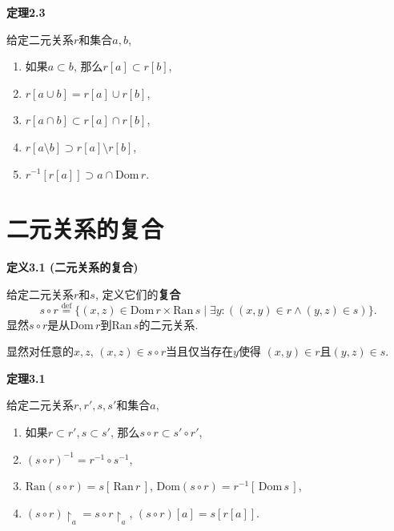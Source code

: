 \vspace{10pt}

\hypertarget{sec:定理2.3}{}
\noindent\textbf{定理2.3}

给定二元关系$r$和集合$a,b$,
\begin{enumerate}
    \item 如果$a\subset b$, 那么$r[a]\subset r[b]$,
    \item $r[a\cup b]=r[a]\cup r[b]$,
    \item $r[a\cap b]\subset r[a]\cap r[b]$,
    \item $r[a\setminus b]\supset r[a]\setminus r[b]$,
    \item $r^{-1}[r[a]]\supset a\cap\mathrm{Dom}\,r$.
\end{enumerate}





\newpage

\section{二元关系的复合}

\hypertarget{sec:定义3.1}{}
\noindent\textbf{定义3.1 (二元关系的复合)}

给定二元关系$r$和$s$, 定义它们的\textbf{复合}
\[
    s\circ r\overset{\mathrm{def}}{=}
    \{(x,z)\in\mathrm{Dom}\,r\times\mathrm{Ran}\,s\mid
    \exists y:((x,y)\in r\land(y,z)\in s)\}.
\]
显然$s\circ r$是从$\mathrm{Dom}\,r$到$\mathrm{Ran}\,s$的二元关系.

显然对任意的$x,z$, $(x,z)\in s\circ r$当且仅当存在$y$使得
$(x,y)\in r$且$(y,z)\in s$.

\vspace{10pt}

\hypertarget{sec:定理3.1}{}
\noindent\textbf{定理3.1}

给定二元关系$r,r',s,s'$和集合$a$,
\begin{enumerate}
    \item 如果$r\subset r',s\subset s'$, 那么$s\circ r\subset s'\circ r'$,
    \item $(s\circ r)^{-1}=r^{-1}\circ s^{-1}$,
    \item $\mathrm{Ran}(s\circ r)=s[\,\mathrm{Ran}\,r\,]$,
    $\mathrm{Dom}(s\circ r)=r^{-1}[\,\mathrm{Dom}\,s\,]$,
    \item $(s\circ r)\!\restriction_a=s\circ r\!\restriction_a$,
    $(s\circ r)[a]=s[r[a]]$.
\end{enumerate}


